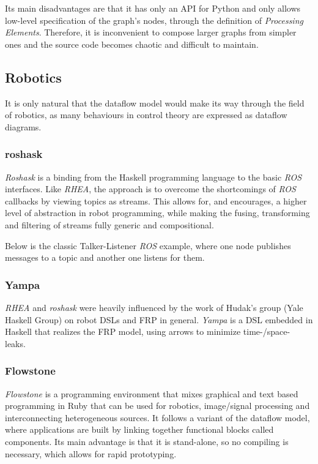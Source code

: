 \documentclass[sigplan,review,anonymous]{acmart}\settopmatter{printfolios=true}
\begin{document}
Its main disadvantages are that it has only an API for Python and only allows low-level specification of the graph's nodes, through the definition of \textit{Processing Elements}. Therefore, it is inconvenient to compose larger graphs from simpler ones and the source code becomes chaotic and difficult to maintain.

\subsection{Robotics}

It is only natural that the dataflow model would make its way through the field of robotics, as many behaviours in control theory are expressed as dataflow diagrams. 

\subsubsection{roshask}

\textit{Roshask}\cite{roshask} is a binding from the Haskell programming language to the basic \textit{ROS} interfaces. Like \textit{RHEA}, the approach is to overcome the shortcomings of \textit{ROS} callbacks by viewing topics as streams. This allows for, and encourages, a higher level of abstraction in robot programming, while making the fusing, transforming and filtering of streams fully generic and compositional. 

Below is the classic Talker-Listener \textit{ROS} example, where one node publishes messages to a topic and another one listens for them.


\subsubsection{Yampa}

\textit{RHEA} and \textit{roshask} were heavily influenced by the work of Hudak's group (Yale Haskell Group) on robot DSLs and FRP in general\cite{fran, arrows_robots,lambda_in_motion,event_frp,real_frp,pushpull_frp}. \textit{Yampa} is a DSL embedded in Haskell that realizes the FRP model, using arrows to minimize time-/space- leaks. 

\subsubsection{Flowstone}

\textit{Flowstone}  is a programming environment that mixes graphical and text based programming in Ruby that can be used for robotics, image/signal processing and interconnecting heterogeneous sources. It follows a variant of the dataflow model, where applications are built by linking together functional blocks called components. Its main advantage is that it is stand-alone, so no compiling is necessary, which allows for rapid prototyping.
\end{document}
